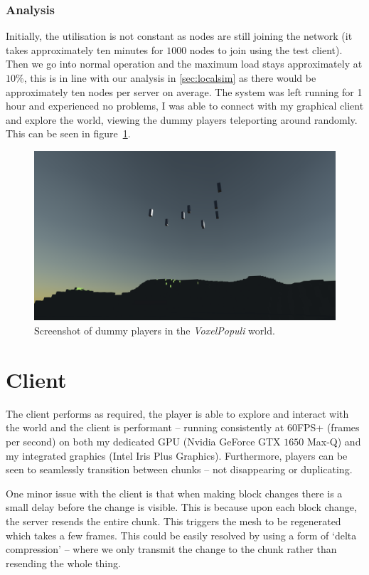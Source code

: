 \documentclass[12pt,notitlepage,a4paper]{report}
\newcommand{\voxpop}{\emph{VoxelPopuli}}
\begin{document}
	\subsubsection{Analysis}
	Initially, the utilisation is not constant as nodes are still joining the network (it takes approximately ten minutes for $1000$ nodes to join using the test client). Then we go into normal operation and the maximum load stays approximately at $10\%$, this is in line with our analysis in \cref{sec:localsim} as there would be approximately ten nodes per server on average. The system was left running for 1 hour and experienced no problems, I was able to connect with my graphical client and explore the world, viewing the dummy players teleporting around randomly. This can be seen in figure~\ref{fig:dummies}.
	\begin{figure}[!ht]
		\includegraphics[width=\textwidth]{dummies.png}
		\caption{Screenshot of dummy players in the \voxpop{} world.}
		\label{fig:dummies}
	\end{figure}

	\section{Client}
	The client performs as required, the player is able to explore and interact with the world and the client is performant -- running consistently at $60$FPS+ (frames per second) on both my dedicated GPU (Nvidia GeForce GTX $1650$ Max-Q) and my integrated graphics (Intel Iris Plus Graphics). Furthermore, players can be seen to seamlessly transition between chunks -- not disappearing or duplicating.
	
	One minor issue with the client is that when making block changes there is a small delay before the change is visible. This is because upon each block change, the server resends the entire chunk. This triggers the mesh to be regenerated which takes a few frames. This could be easily resolved by using a form of `delta compression' -- where we only transmit the change to the chunk rather than resending the whole thing.
\end{document}
